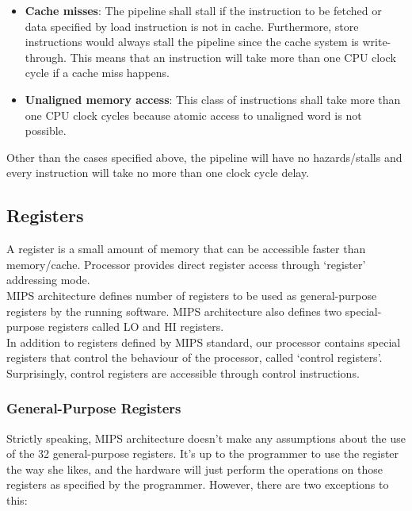 \documentclass[]{scrartcl}
\begin{document}
\begin{itemize}
\item \textbf{Cache misses}:
      The pipeline shall stall if the instruction to
      be fetched or data specified by load instruction is not in cache.
      Furthermore, store instructions would always stall the pipeline
      since the cache system is write-through. This means that an
      instruction will take more than one CPU clock cycle if a cache
      miss happens.

\item \textbf{Unaligned memory access}:
      This class of instructions shall take
      more than one CPU clock cycles because atomic access to unaligned
      word is not possible.

\end{itemize}

Other than the cases specified above, the pipeline will have no
hazards/stalls and every instruction will take no more than one clock cycle
delay.

\subsection{Registers}

A register is a small amount of memory that can be accessible
faster than memory/cache. Processor provides direct register
access through `register' addressing mode.\\

MIPS architecture defines number of registers to be used
as general-purpose registers by the running software. MIPS
architecture also defines two special-purpose registers called
LO and HI registers.\\

In addition to registers defined by MIPS standard, our processor
contains special registers that control the behaviour of the processor,
called `control registers'. Surprisingly, control registers are
accessible through control instructions.\\ 

\subsubsection{General-Purpose Registers}

Strictly speaking, MIPS architecture doesn't make any assumptions
about the use of the 32 general-purpose registers. It's up to the
programmer to use the register the way she likes, and the hardware
will just perform the operations on those registers as specified
by the programmer. However, there are two exceptions to this:
\end{document}
